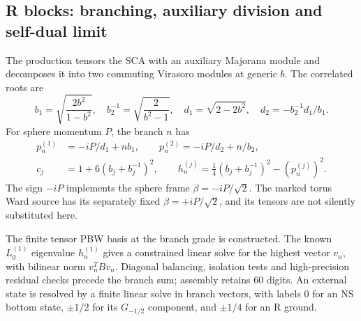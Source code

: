 \documentclass[11pt]{article}
\begin{document}
\subsection{R blocks: branching, auxiliary division and self-dual limit}
The production tensors the SCA with an auxiliary Majorana module and
decomposes it into two commuting Virasoro modules at generic \(b\).
The correlated roots are
\begin{equation}
 b_1=\sqrt{\frac{2b^2}{1-b^2}},\quad b_2^{-1}=\sqrt{\frac2{b^2-1}},
 \quad d_1=\sqrt{2-2b^2},\quad d_2=-b_2^{-1}d_1/b_1.
\end{equation}
For sphere momentum \(P\), the branch \(n\) has
\begin{align}
 p_n^{(1)}&=-iP/d_1+nb_1,\qquad p_n^{(2)}=-iP/d_2+n/b_2,\\
 c_j&=1+6(b_j+b_j^{-1})^2,\qquad
 h_n^{(j)}=\tfrac14(b_j+b_j^{-1})^2-(p_n^{(j)})^2.
\end{align}
The sign \(-iP\) implements the sphere frame \(\beta=-iP/\sqrt2\).
The marked torus Ward source has its separately fixed
\(\beta=+iP/\sqrt2\), and its tensors are not silently substituted here.

The finite tensor PBW basis at the branch grade is constructed.
The known \(L_0^{(1)}\) eigenvalue \(h_n^{(1)}\) gives a constrained
linear solve for the highest vector \(v_n\), with bilinear norm
\(v_n^TBv_n\). Diagonal balancing, isolation tests and high-precision
residual checks precede the branch sum; assembly retains 60 digits.
An external state is resolved by a finite linear solve in branch
vectors, with labels \(0\) for an NS bottom state, \(\pm1/2\) for
its \(G_{-1/2}\) component, and \(\pm1/4\) for an R ground.
\end{document}
